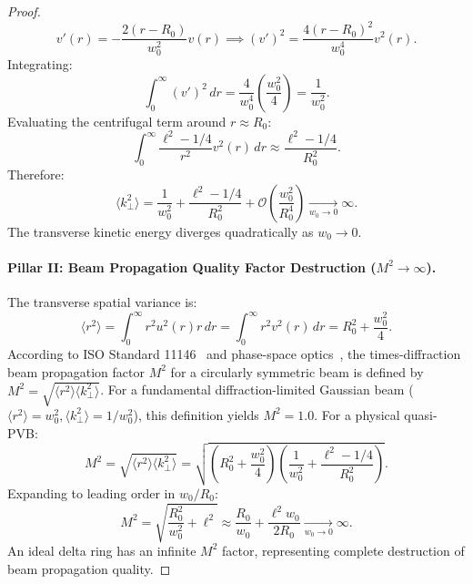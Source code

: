 \documentclass[11pt,a4paper]{article}
\begin{document}
\begin{proof}
\begin{equation}
v'(r) = - \frac{2(r - R_0)}{w_0^2} v(r) \implies (v')^2 = \frac{4(r - R_0)^2}{w_0^4} v^2(r).
\label{eq:v_prime_squared}
\end{equation}
Integrating:
\begin{equation}
\int_0^\infty (v')^2 \, dr = \frac{4}{w_0^4} \left( \frac{w_0^2}{4} \right) = \frac{1}{w_0^2}.
\label{eq:v_prime_integral}
\end{equation}
Evaluating the centrifugal term around $r \approx R_0$:
\begin{equation}
\int_0^\infty \frac{\ell^2 - 1/4}{r^2} v^2(r) \, dr \approx \frac{\ell^2 - 1/4}{R_0^2}.
\label{eq:centrifugal_integral}
\end{equation}
Therefore:
\begin{equation}
\boxed{\langle k_\perp^2 \rangle = \frac{1}{w_0^2} + \frac{\ell^2 - 1/4}{R_0^2} + \mathcal{O}\left( \frac{w_0^2}{R_0^4} \right) \xrightarrow[w_0 \to 0]{} \infty.}
\label{eq:pillar1_result}
\end{equation}
The transverse kinetic energy diverges quadratically as $w_0 \to 0$.

\paragraph{Pillar II: Beam Propagation Quality Factor Destruction ($M^2 \to \infty$).}
The transverse spatial variance is:
\begin{equation}
\langle r^2 \rangle = \int_0^\infty r^2 u^2(r) r \, dr = \int_0^\infty r^2 v^2(r) \, dr = R_0^2 + \frac{w_0^2}{4}.
\label{eq:spatial_variance}
\end{equation}
According to ISO Standard 11146~\cite{ISO11146} and phase-space optics~\cite{Alonso2011}, the times-diffraction beam propagation factor $M^2$ for a circularly symmetric beam is defined by $M^2 = \sqrt{\langle r^2 \rangle \langle k_\perp^2 \rangle}$. For a fundamental diffraction-limited Gaussian beam ($\langle r^2 \rangle = w_0^2, \langle k_\perp^2 \rangle = 1/w_0^2$), this definition yields $M^2 = 1.0$. For a physical quasi-PVB:
\begin{equation}
M^2 = \sqrt{\langle r^2 \rangle \langle k_\perp^2 \rangle} = \sqrt{\left( R_0^2 + \frac{w_0^2}{4} \right)\left( \frac{1}{w_0^2} + \frac{\ell^2 - 1/4}{R_0^2} \right)}.
\label{eq:m2_formula}
\end{equation}
Expanding to leading order in $w_0 / R_0$:
\begin{equation}
\boxed{M^2 = \sqrt{\frac{R_0^2}{w_0^2} + \ell^2} \approx \frac{R_0}{w_0} + \frac{\ell^2 w_0}{2 R_0} \xrightarrow[w_0 \to 0]{} \infty.}
\label{eq:pillar2_result}
\end{equation}
An ideal delta ring has an infinite $M^2$ factor, representing complete destruction of beam propagation quality.


\end{proof}
\end{document}
